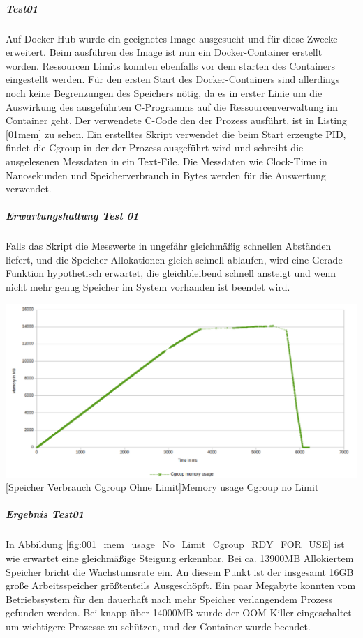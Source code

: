 \subparagraph{Test01}
Auf Docker-Hub wurde ein geeignetes Image ausgesucht und für diese Zwecke erweitert. Beim ausführen des Image ist nun ein Docker-Container erstellt worden. Ressourcen Limits konnten ebenfalls vor dem starten des Containers eingestellt werden. Für den ersten Start des Docker-Containers sind allerdings noch keine Begrenzungen des Speichers nötig, da es in erster Linie um die Auswirkung des ausgeführten C-Programms auf die Ressourcenverwaltung im Container geht. Der verwendete C-Code den der Prozess ausführt, ist in Listing \ref{01mem} zu sehen. Ein erstelltes Skript verwendet die beim Start erzeugte PID, findet die Cgroup in der der Prozess ausgeführt wird und schreibt die ausgelesenen Messdaten in ein Text-File. Die Messdaten wie Clock-Time in Nanosekunden und Speicherverbrauch in Bytes werden für die Auswertung verwendet.


\vspace{1em}


\subparagraph{Erwartungshaltung Test 01}
Falls das Skript die Messwerte in ungefähr gleichmäßig schnellen Abständen liefert, und die Speicher Allokationen gleich schnell ablaufen, wird eine Gerade Funktion hypothetisch erwartet, die gleichbleibend schnell ansteigt und wenn nicht mehr genug Speicher im System vorhanden ist beendet wird.

\vspace{1em}
\begin{minipage}{\linewidth}
	\centering
	\includegraphics[width=1\linewidth]{pics/001_mem_usage_No_Limit_Cgroup_RDY_FOR_USE.png}
	[Speicher Verbrauch Cgroup Ohne Limit]{Memory usage Cgroup no Limit}
	\label{fig:001_mem_usage_No_Limit_Cgroup_RDY_FOR_USE}
\end{minipage}

\subparagraph{Ergebnis Test01}
In Abbildung \ref{fig:001_mem_usage_No_Limit_Cgroup_RDY_FOR_USE} ist wie erwartet eine gleichmäßige Steigung erkennbar. Bei ca. 13900MB Allokiertem Speicher bricht die Wachstumsrate ein. An diesem Punkt ist der insgesamt 16GB große Arbeitsspeicher größtenteils Ausgeschöpft. Ein paar Megabyte konnten vom Betriebssystem für den dauerhaft nach mehr Speicher verlangendem Prozess gefunden werden. Bei knapp über 14000MB wurde der OOM-Killer eingeschaltet um wichtigere Prozesse zu schützen, und der Container wurde beendet.

